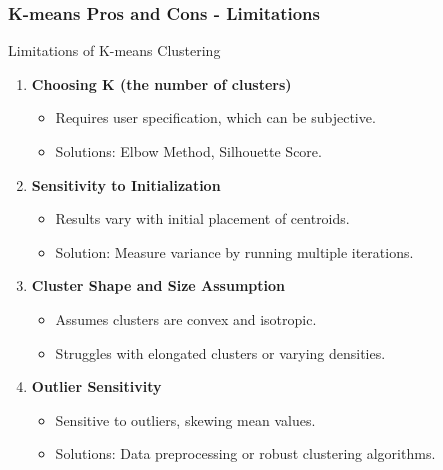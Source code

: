 \documentclass[aspectratio=169]{beamer}
\begin{document}
\begin{frame}[fragile]
    \frametitle{K-means Pros and Cons - Limitations}
    \begin{block}{Limitations of K-means Clustering}
        \begin{enumerate}
            \item \textbf{Choosing K (the number of clusters)}
                \begin{itemize}
                    \item Requires user specification, which can be subjective.
                    \item Solutions: Elbow Method, Silhouette Score.
                \end{itemize}
            \item \textbf{Sensitivity to Initialization}
                \begin{itemize}
                    \item Results vary with initial placement of centroids.
                    \item Solution: Measure variance by running multiple iterations.
                \end{itemize}
            \item \textbf{Cluster Shape and Size Assumption}
                \begin{itemize}
                    \item Assumes clusters are convex and isotropic.
                    \item Struggles with elongated clusters or varying densities.
                \end{itemize}
            \item \textbf{Outlier Sensitivity}
                \begin{itemize}
                    \item Sensitive to outliers, skewing mean values.
                    \item Solutions: Data preprocessing or robust clustering algorithms.
                \end{itemize}
        \end{enumerate}
    \end{block}
\end{frame}
\end{document}
